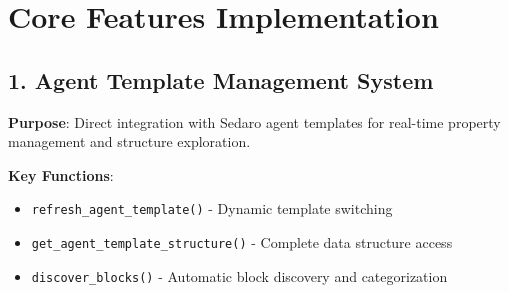 \documentclass[12pt,a4paper]{article}
\begin{document}
\section{Core Features Implementation}

\subsection{1. Agent Template Management System}

\textbf{Purpose}: Direct integration with Sedaro agent templates for real-time property management and structure exploration.

\textbf{Key Functions}:
\begin{itemize}
    \item \texttt{refresh\_agent\_template()} - Dynamic template switching
    \item \texttt{get\_agent\_template\_structure()} - Complete data structure access
    \item \texttt{discover\_blocks()} - Automatic block discovery and categorization
\end{itemize}
\end{document}
